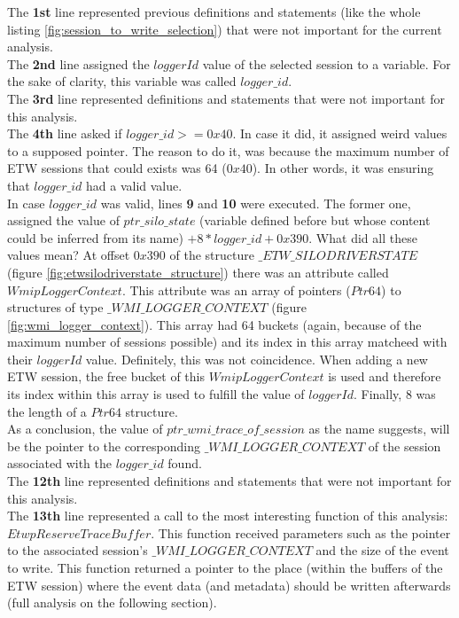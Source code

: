 The {\bfseries 1st} line represented previous definitions and statements (like the whole listing \ref{fig:session_to_write_selection}) that were not important for the current analysis. \\
The {\bfseries 2nd} line assigned the $loggerId$ value of the selected session to a variable. For the sake of clarity, this variable was called $logger\_id$.\\
The {\bfseries 3rd} line represented definitions and statements that were not important for this analysis.\\
The {\bfseries 4th} line asked if $logger\_id >= 0x40$. In case it did, it assigned weird values to a supposed pointer. The reason to do it, was because the maximum number of ETW sessions that could exists was 64 ($0x40$). In other words, it was ensuring that $logger\_id$ had a valid value. \\
In case $logger\_id$ was valid, lines {\bfseries 9} and {\bfseries 10} were executed. The former one, assigned the value of $ptr\_silo\_state$ (variable defined before but whose content could be inferred from its name) $+ 8 * logger\_id + 0x390$. What did all these values mean? 
At offset $0x390$ of the structure $\_ETW\_SILODRIVERSTATE$ (figure \ref{fig:etwsilodriverstate_structure}) there was an attribute called $WmipLoggerContext$. This attribute was an array of pointers ($Ptr64$) to structures of type $\_WMI\_LOGGER\_CONTEXT$ (figure \ref{fig:wmi_logger_context}). This array had 64 buckets (again, because of the maximum number of sessions possible) and its index in this array matcheed with their $loggerId$ value. Definitely, this was not coincidence. When adding a new ETW session, the free bucket of this $WmipLoggerContext$ is used and therefore its index within this array is used to fulfill the value of $loggerId$. Finally, $8$ was the length of a $Ptr64$ structure. \\
As a conclusion, the value of $ptr\_wmi\_trace\_of\_session$ as the name suggests, will be the pointer to the corresponding $\_WMI\_LOGGER\_CONTEXT$ of the session associated with the $logger\_id$ found. \\
The {\bfseries 12th} line represented definitions and statements that were not important for this analysis.\\
The {\bfseries 13th} line represented a call to the most interesting function of this analysis:\\
$EtwpReserveTraceBuffer$. This function received parameters such as the pointer to the associated session's $\_WMI\_LOGGER\_CONTEXT$ and the size of the event to write. This function returned a pointer to the place (within the buffers of the ETW session) where the event data (and metadata) should be written afterwards (full analysis on the following section). \\
